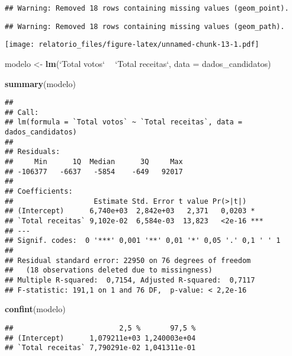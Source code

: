 \documentclass[]{article}
\newenvironment{Shaded}{\begin{snugshade}}{\end{snugshade}}
\newcommand{\KeywordTok}[1]{\textcolor[rgb]{0.13,0.29,0.53}{\textbf{#1}}}
\newcommand{\DataTypeTok}[1]{\textcolor[rgb]{0.13,0.29,0.53}{#1}}
\newcommand{\StringTok}[1]{\textcolor[rgb]{0.31,0.60,0.02}{#1}}
\newcommand{\OperatorTok}[1]{\textcolor[rgb]{0.81,0.36,0.00}{\textbf{#1}}}
\newcommand{\NormalTok}[1]{#1}
\begin{document}
\begin{verbatim}
## Warning: Removed 18 rows containing missing values (geom_point).
\end{verbatim}

\begin{verbatim}
## Warning: Removed 18 rows containing missing values (geom_path).
\end{verbatim}

\texttt{[image: relatorio\_files/figure-latex/unnamed-chunk-13-1.pdf]}

\begin{Shaded}
\begin{Highlighting}[]
\NormalTok{modelo <-}\StringTok{ }\KeywordTok{lm}\NormalTok{(}\StringTok{`}\DataTypeTok{Total votos}\StringTok{`} \OperatorTok{~}\StringTok{ `}\DataTypeTok{Total receitas}\StringTok{`}\NormalTok{, }\DataTypeTok{data =}\NormalTok{ dados_candidatos)}
  
  \KeywordTok{summary}\NormalTok{(modelo)}
\end{Highlighting}
\end{Shaded}

\begin{verbatim}
## 
## Call:
## lm(formula = `Total votos` ~ `Total receitas`, data = dados_candidatos)
## 
## Residuals:
##     Min      1Q  Median      3Q     Max 
## -106377   -6637   -5854    -649   92017 
## 
## Coefficients:
##                   Estimate Std. Error t value Pr(>|t|)    
## (Intercept)      6,740e+03  2,842e+03   2,371   0,0203 *  
## `Total receitas` 9,102e-02  6,584e-03  13,823   <2e-16 ***
## ---
## Signif. codes:  0 '***' 0,001 '**' 0,01 '*' 0,05 '.' 0,1 ' ' 1
## 
## Residual standard error: 22950 on 76 degrees of freedom
##   (18 observations deleted due to missingness)
## Multiple R-squared:  0,7154, Adjusted R-squared:  0,7117 
## F-statistic: 191,1 on 1 and 76 DF,  p-value: < 2,2e-16
\end{verbatim}

\begin{Shaded}
\begin{Highlighting}[]
  \KeywordTok{confint}\NormalTok{(modelo)}
\end{Highlighting}
\end{Shaded}

\begin{verbatim}
##                         2,5 %       97,5 %
## (Intercept)      1,079211e+03 1,240003e+04
## `Total receitas` 7,790291e-02 1,041311e-01
\end{verbatim}
\end{document}
